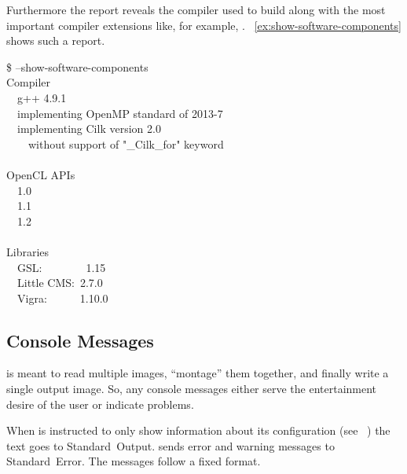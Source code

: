 %
Furthermore the report reveals the compiler used to build \appcmd{} along with the most
important compiler extensions like, for example, .
\exampleName~\ref{ex:show-software-components} shows such a report.

\begin{exemplar}
  \begin{terminal}
    \$ \app{} --show-software-components \\
    Compiler \\
    ~~g++ 4.9.1 \\
    ~~implementing OpenMP standard of 2013-7 \\
    ~~implementing Cilk version 2.0 \\
    ~~~~without support of "\_Cilk\_for" keyword \\
    ~ \\
    OpenCL APIs \\
    ~~1.0 \\
    ~~1.1 \\
    ~~1.2  \\
    ~ \\
    Libraries \\
    ~~GSL:~~~~~~~~1.15 \\
    ~~Little CMS:~2.7.0 \\
    ~~Vigra:~~~~~~1.10.0
  \end{terminal}

  \caption[Output of ]%
          {\label{ex:show-software-components}%
            Output of \appcmd{} when asked to reveal the compiler that was used to build it
            along with the libraries it was linked against.}
\end{exemplar}


\subsection[Console Messages]{\label{sec:console-messages}%
  Console Messages}

\App{} is meant to read multiple images, ``montage'' them together, and finally write a single
output image.  So, any console messages either serve the entertainment desire of the user or
indicate problems.

%
When \appcmd{} is instructed to only show information about its configuration (see
\sectionName~) the text goes to Standard~Output.  \appcmd{}
sends error and warning messages to Standard~Error.  The messages follow a fixed format.


